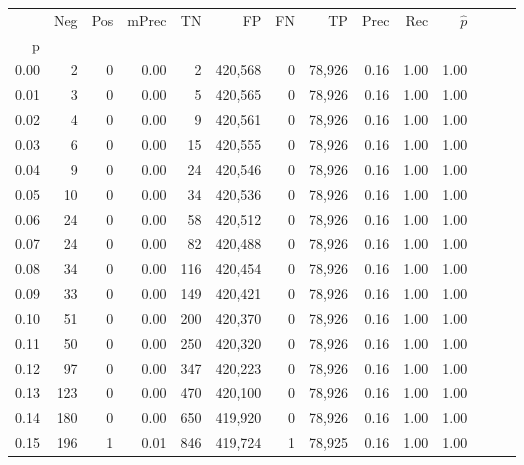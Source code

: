 \begin{tabular}{rrrrrrrrrrrrrr}
\toprule
{} &     Neg &    Pos & mPrec &       TN &       FP &      FN &      TP &  Prec &   Rec & $\hat{p}$ \\
p    &         &        &       &          &          &         &         &       &       &           \\
\midrule
0.00 &       2 &      0 &  0.00 &        2 &  420,568 &       0 &  78,926 &  0.16 &  1.00 &      1.00 \\
0.01 &       3 &      0 &  0.00 &        5 &  420,565 &       0 &  78,926 &  0.16 &  1.00 &      1.00 \\
0.02 &       4 &      0 &  0.00 &        9 &  420,561 &       0 &  78,926 &  0.16 &  1.00 &      1.00 \\
0.03 &       6 &      0 &  0.00 &       15 &  420,555 &       0 &  78,926 &  0.16 &  1.00 &      1.00 \\
0.04 &       9 &      0 &  0.00 &       24 &  420,546 &       0 &  78,926 &  0.16 &  1.00 &      1.00 \\
0.05 &      10 &      0 &  0.00 &       34 &  420,536 &       0 &  78,926 &  0.16 &  1.00 &      1.00 \\
0.06 &      24 &      0 &  0.00 &       58 &  420,512 &       0 &  78,926 &  0.16 &  1.00 &      1.00 \\
0.07 &      24 &      0 &  0.00 &       82 &  420,488 &       0 &  78,926 &  0.16 &  1.00 &      1.00 \\
0.08 &      34 &      0 &  0.00 &      116 &  420,454 &       0 &  78,926 &  0.16 &  1.00 &      1.00 \\
0.09 &      33 &      0 &  0.00 &      149 &  420,421 &       0 &  78,926 &  0.16 &  1.00 &      1.00 \\
0.10 &      51 &      0 &  0.00 &      200 &  420,370 &       0 &  78,926 &  0.16 &  1.00 &      1.00 \\
0.11 &      50 &      0 &  0.00 &      250 &  420,320 &       0 &  78,926 &  0.16 &  1.00 &      1.00 \\
0.12 &      97 &      0 &  0.00 &      347 &  420,223 &       0 &  78,926 &  0.16 &  1.00 &      1.00 \\
0.13 &     123 &      0 &  0.00 &      470 &  420,100 &       0 &  78,926 &  0.16 &  1.00 &      1.00 \\
0.14 &     180 &      0 &  0.00 &      650 &  419,920 &       0 &  78,926 &  0.16 &  1.00 &      1.00 \\
0.15 &     196 &      1 &  0.01 &      846 &  419,724 &       1 &  78,925 &  0.16 &  1.00 &      1.00 \\

\end{tabular}
